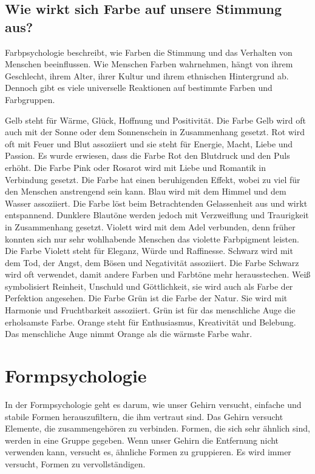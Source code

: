 \subsection{Wie wirkt sich Farbe auf unsere Stimmung aus?}
Farbpsychologie beschreibt, wie Farben die Stimmung und das Verhalten von Menschen beeinflussen. Wie Menschen Farben wahrnehmen, hängt von ihrem Geschlecht, ihrem Alter, ihrer Kultur und ihrem ethnischen Hintergrund ab. Dennoch gibt es viele universelle Reaktionen auf bestimmte Farben und Farbgruppen. 
\cite{_special_subjects} 
\cite{_line_color_form}

Gelb steht für Wärme, Glück, Hoffnung und Positivität. Die Farbe Gelb wird oft auch mit der Sonne oder dem Sonnenschein in Zusammenhang gesetzt.\cite{_special_subjects}\cite{_maler_michels}
Rot wird oft mit Feuer und Blut assoziiert und sie steht für Energie, Macht, Liebe und Passion. Es wurde erwiesen, dass die Farbe Rot den Blutdruck und den Puls erhöht. \cite{_special_subjects}\cite{_maler_michels}
Die Farbe Pink oder Rosarot wird mit Liebe und Romantik in Verbindung gesetzt. Die Farbe hat einen beruhigenden Effekt, wobei zu viel für den Menschen anstrengend sein kann.\cite{_special_subjects} \cite{_maler_michels}
Blau wird mit dem Himmel und dem Wasser assoziiert. Die Farbe löst beim Betrachtenden Gelassenheit aus und wirkt entspannend. Dunklere Blautöne werden jedoch mit Verzweiflung und Traurigkeit in Zusammenhang gesetzt. \cite{_special_subjects} \cite{_maler_michels}
Violett wird mit dem Adel verbunden, denn früher konnten sich nur sehr wohlhabende Menschen das violette Farbpigment leisten. Die Farbe Violett steht für Eleganz, Würde und Raffinesse. \cite{_special_subjects} \cite{_maler_michels}
Schwarz wird mit dem Tod, der Angst, dem Bösen und Negativität assoziiert. Die Farbe Schwarz wird oft verwendet, damit andere Farben und Farbtöne mehr herausstechen. \cite{_special_subjects} \cite{_maler_michels}
Weiß symbolisiert Reinheit, Unschuld und Göttlichkeit, sie wird auch als Farbe der Perfektion angesehen. \cite{_special_subjects} \cite{_maler_michels}
Die Farbe Grün ist die Farbe der Natur. Sie wird mit Harmonie und Fruchtbarkeit assoziiert. Grün ist für das menschliche Auge die erholsamste Farbe. \cite{_special_subjects} \cite{_maler_michels}
Orange steht für Enthusiasmus, Kreativität und Belebung. Das menschliche Auge nimmt Orange als die wärmste Farbe wahr. \cite{_special_subjects}
\cite{_maler_michels}

\section{Formpsychologie}
In der Formpsychologie geht es darum, wie unser Gehirn versucht, einfache und stabile Formen herauszufiltern, die ihm vertraut sind. Das Gehirn versucht Elemente, die zusammengehören zu verbinden. Formen, die sich sehr ähnlich sind, werden in eine Gruppe gegeben. Wenn unser Gehirn die Entfernung nicht verwenden kann, versucht es, ähnliche Formen zu gruppieren. Es wird immer versucht, Formen zu vervollständigen.
\cite{_drawing_basics_and_video_game_art}
\cite{_line_color_form}

